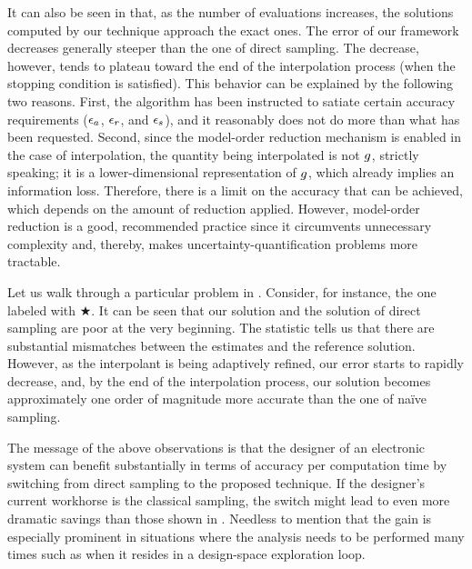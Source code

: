 It can also be seen in  that, as the number of evaluations
increases, the solutions computed by our technique approach the exact ones. The
error of our framework decreases generally steeper than the one of direct
sampling. The decrease, however, tends to plateau toward the end of the
interpolation process (when the stopping condition is satisfied). This behavior
can be explained by the following two reasons. First, the algorithm has been
instructed to satiate certain accuracy requirements ($\epsilon_a$, $\epsilon_r$, and
$\epsilon_s$), and it reasonably does not do more than what has been requested.
Second, since the model-order reduction mechanism is enabled in the case of
interpolation, the quantity being interpolated is not $g$, strictly speaking;
it is a lower-dimensional representation of $g$, which already implies an
information loss. Therefore, there is a limit on the accuracy that can be
achieved, which depends on the amount of reduction applied. However, model-order
reduction is a good, recommended practice since it circumvents unnecessary
complexity and, thereby, makes uncertainty-quantification problems more
tractable.

Let us walk through a particular problem in . Consider, for
instance, the one labeled with $\bigstar$. It can be seen that our solution and
the solution of direct sampling are poor at the very beginning. The 
statistic tells us that there are substantial mismatches between the estimates
and the reference solution. However, as the interpolant is being adaptively
refined, our error starts to rapidly decrease, and, by the end of the
interpolation process, our solution becomes approximately one order of magnitude
more accurate than the one of na\"{i}ve sampling.

The message of the above observations is that the designer of an electronic
system can benefit substantially in terms of accuracy per computation time by
switching from direct sampling to the proposed technique. If the designer's
current workhorse is the classical  sampling, the switch might lead to
even more dramatic savings than those shown in . Needless to
mention that the gain is especially prominent in situations where the analysis
needs to be performed many times such as when it resides in a design-space
exploration loop.

